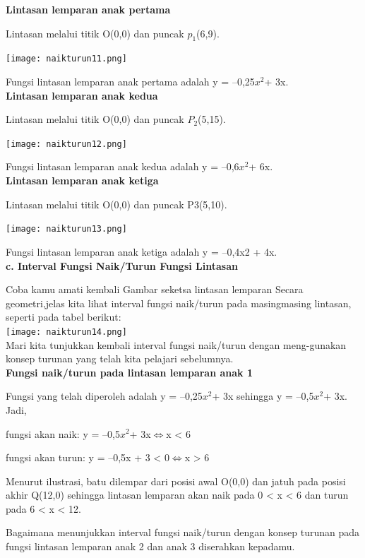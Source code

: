 \documentclass[11pt,fleqn]{book} %
\begin{document}
\textbf{Lintasan lemparan anak pertama}

Lintasan melalui titik O(0,0) dan puncak $p_{1}$(6,9).

\texttt{[image: naikturun11.png]}

Fungsi lintasan lemparan anak pertama adalah y = –0,25$x^{2} $+ 3x.\\

\textbf{Lintasan lemparan anak kedua}

Lintasan melalui titik O(0,0) dan puncak $P_{2}$(5,15).

\texttt{[image: naikturun12.png]}

Fungsi lintasan lemparan anak kedua adalah y = –0,6$x^{2} $+ 6x.\\

\textbf{Lintasan lemparan anak ketiga}

Lintasan melalui titik O(0,0) dan puncak P3(5,10).

\texttt{[image: naikturun13.png]}

Fungsi lintasan lemparan anak ketiga adalah y = –0,4x2 +
4x.\\

\textbf{c. Interval Fungsi Naik/Turun Fungsi Lintasan}

Coba kamu amati kembali Gambar seketsa lintasan lemparan Secara geometri,jelas kita lihat interval fungsi naik/turun pada masingmasing lintasan, seperti pada tabel berikut:\\

\texttt{[image: naikturun14.png]}\\

Mari kita tunjukkan kembali interval fungsi naik/turun dengan meng-gunakan konsep turunan yang telah kita pelajari sebelumnya.\\

\textbf{Fungsi naik/turun pada lintasan lemparan anak 1}

Fungsi yang telah diperoleh adalah y = –0,25$x^{2} $+ 3x sehingga y = –0,5$x^{2} $+ 3x. Jadi,

fungsi akan naik: y = –0,5$x^{2} $+ 3x$ \Leftrightarrow $x < 6

fungsi akan turun: y = –0,5x + 3 < 0$ \Leftrightarrow $x > 6

Menurut ilustrasi, batu dilempar dari posisi awal O(0,0) dan jatuh pada posisi akhir Q(12,0) sehingga lintasan lemparan akan naik pada 0 < x < 6 dan turun pada 6 < x < 12.

Bagaimana menunjukkan interval fungsi naik/turun
dengan konsep turunan pada fungsi lintasan lemparan
anak 2 dan anak 3 diserahkan kepadamu.
\end{document}
